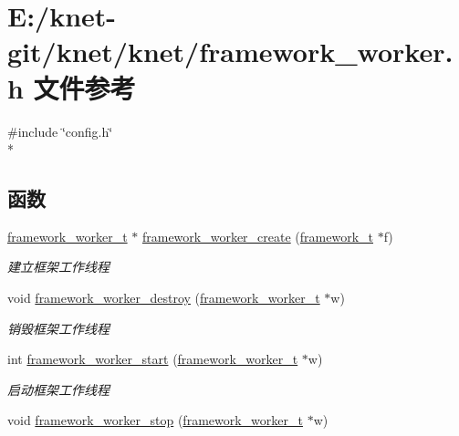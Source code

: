 \hypertarget{a00054}{}\section{E\+:/knet-\/git/knet/knet/framework\+\_\+worker.h 文件参考}
\label{a00054}
{\ttfamily \#include \char`\"{}config.\+h\char`\"{}}\\*
\subsection*{函数}
\begin{DoxyCompactItemize}
\item 
\hyperlink{a00047_aeb7a44e6b579659a8aae81f3ab819af3_aeb7a44e6b579659a8aae81f3ab819af3}{framework\+\_\+worker\+\_\+t} $\ast$ \hyperlink{a00054_a0617a9e873aa183a3bb0cc33a542a8a1_a0617a9e873aa183a3bb0cc33a542a8a1}{framework\+\_\+worker\+\_\+create} (\hyperlink{a00047_a6149d769f6f07ed14a40a271c95d8463_a6149d769f6f07ed14a40a271c95d8463}{framework\+\_\+t} $\ast$f)
\begin{DoxyCompactList}\small\item\em 建立框架工作线程 \end{DoxyCompactList}\item 
void \hyperlink{a00054_a1f5d04499db3c8137c840c8c87cdba5e_a1f5d04499db3c8137c840c8c87cdba5e}{framework\+\_\+worker\+\_\+destroy} (\hyperlink{a00047_aeb7a44e6b579659a8aae81f3ab819af3_aeb7a44e6b579659a8aae81f3ab819af3}{framework\+\_\+worker\+\_\+t} $\ast$w)
\begin{DoxyCompactList}\small\item\em 销毁框架工作线程 \end{DoxyCompactList}\item 
int \hyperlink{a00054_a8030b85e272bfe80459bbecbca5cd9c0_a8030b85e272bfe80459bbecbca5cd9c0}{framework\+\_\+worker\+\_\+start} (\hyperlink{a00047_aeb7a44e6b579659a8aae81f3ab819af3_aeb7a44e6b579659a8aae81f3ab819af3}{framework\+\_\+worker\+\_\+t} $\ast$w)
\begin{DoxyCompactList}\small\item\em 启动框架工作线程 \end{DoxyCompactList}\item 
void \hyperlink{a00054_a52ecf94ed22881622a06600042ab1bb1_a52ecf94ed22881622a06600042ab1bb1}{framework\+\_\+worker\+\_\+stop} (\hyperlink{a00047_aeb7a44e6b579659a8aae81f3ab819af3_aeb7a44e6b579659a8aae81f3ab819af3}{framework\+\_\+worker\+\_\+t} $\ast$w)

\end{DoxyCompactItemize}
